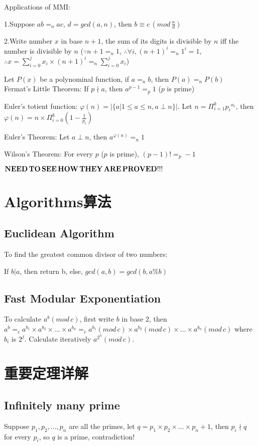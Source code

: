 \documentclass[12pt,a4paper]{ctexrep}
\begin{document}
Applications of MMI:

1.Suppose $ab =_n ac, \, d=gcd(a,n)$, then $ b\equiv c\,(mod\,\frac{n}{d})$

2.Write number $x$ in base $n+1$, the sum of its digits is divisible by $n$ iff the number is divisible by $n$ ($\because n+1 =_n 1$, $\therefore \forall i, (n+1)^i =_n 1^i = 1$, $\therefore x=\sum_{i=0}^j x_i\times(n+1)^i =_n \sum_{i=0}^j x_i$)

Let $P(x)$ be a polynominal function, if $a =_n b$, then $P(a) =_n P(b)$\\

Fermat's Little Theorem:
If $p\nmid a$, then $a^{p-1} =_p 1$ ($p$ is prime)

Euler's totient function:
$\varphi(n) = |\{a|1\leqslant a \leqslant n, a\perp n\}|$. Let $n=\Pi_{i=1}^k {p_i}^{\alpha_i}$, then $\varphi(n) = n\times \Pi_{i=0}^k (1-\frac{1}{p_i})$

Euler's Theorem:
Let $a \perp n$, then $a^{\varphi(n)} =_n 1$

Wilson's Theorem:
For every $p$ ($p$ is prime), $(p-1)! =_p -1$

$\bold{NEED\, TO\, SEE\, HOW\, THEY\, ARE\, PROVED!!!}$

\section{Algorithms算法}
\subsection{Euclidean Algorithm}
To find the greatest common divisor of two numbers:

If $b|a$, then return b, else, $gcd(a,b) = gcd(b,a\%b)$
\subsection{Fast Modular Exponentiation}
To calculate $a^b (mod\, c)$, first write $b$ in base 2, then $a^b =_c a^{b_1} \times a^{b_2} \times \dots \times a^{b_n} =_c a^{b_1}(mod\, c) \times a^{b_2}(mod\, c) \times  \dots \times a^{b_n}(mod\, c)$ where $b_i$ is $2^j$. Calculate iteratively $a^{2^n} (mod\, c)$.

\section{重要定理详解}
\subsection{Infinitely many prime}
Suppose $p_1,p_2,\dots,p_n$ are all the primes, let $q = p_1\times p_2\times \dots \times p_n+1$, then $p_i \nmid q$ for every $p_i$, so $q$ is a prime, contradiction!
\end{document}
